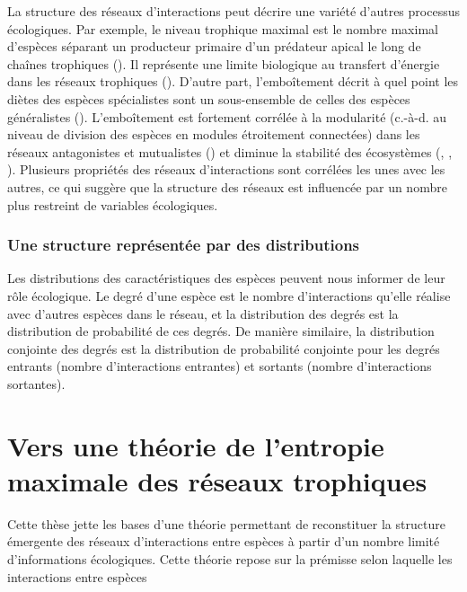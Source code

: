 La structure des réseaux d'interactions peut décrire une variété d'autres
processus écologiques. Par exemple, le niveau trophique maximal est le nombre
maximal d'espèces séparant un producteur primaire d'un prédateur apical le long
de chaînes trophiques (\cite{Cohen1978Food}). Il représente une limite
biologique au transfert d'énergie dans les réseaux trophiques
(\cite{Williams2004Limits}). D'autre part, l'emboîtement décrit à quel point les
diètes des espèces spécialistes sont un sous-ensemble de celles des espèces
généralistes (\cite{Staniczenko2013Ghost}). L'emboîtement est fortement corrélée
à la modularité (c.-à-d. au niveau de division des espèces en modules
étroitement connectées) dans les réseaux antagonistes et mutualistes
(\cite{Fortuna2010Nestedness}) et diminue la stabilité des écosystèmes
(\cite{Okuyama2008Network}, \cite{Bastolla2009Architecture},
\cite{Thebault2010Stability}). Plusieurs propriétés des réseaux d'interactions
sont corrélées les unes avec les autres, ce qui suggère que la structure des
réseaux est influencée par un nombre plus restreint de variables écologiques.

\subsubsection{Une structure représentée par des distributions} 

Les distributions des caractéristiques des espèces peuvent nous informer de 
leur rôle écologique. Le degré d'une espèce est le nombre d'interactions qu'elle réalise avec d'autres
espèces dans le réseau, et la distribution des degrés est la distribution de
probabilité de ces degrés. De manière similaire, la distribution conjointe des
degrés est la distribution de probabilité conjointe pour les degrés entrants
(nombre d'interactions entrantes) et sortants (nombre d'interactions sortantes).


\section{Vers une théorie de l'entropie maximale des réseaux trophiques}

Cette thèse jette les bases d'une théorie permettant de reconstituer la
structure émergente des réseaux d'interactions entre espèces à partir d'un
nombre limité d'informations écologiques. Cette théorie repose sur la prémisse
selon laquelle les interactions entre espèces 

